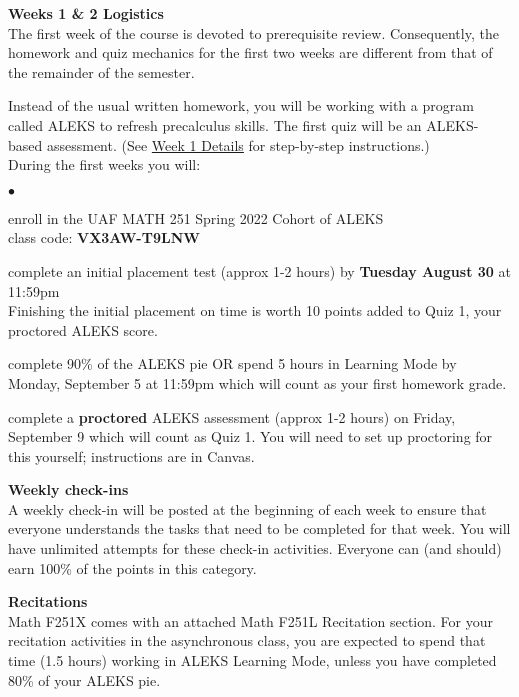 \documentclass[12pt]{article}
\renewcommand{\emph}[1]{\textsf{\textbf{#1}}}
\newcommand{\localhead}[1]{\par\smallskip\textbf{#1}\nobreak\\}%
\def\heading#1{\localhead{\large\emph{#1}}}
\newenvironment{clist}%
{\bgroup\parskip 0pt\begin{list}{$\bullet$}{\partopsep 4pt\topsep 0pt\itemsep -2pt}}%
{\end{list}\egroup}%
\begin{document}
\heading{Weeks 1 \& 2 Logistics}
The first week of the course is devoted to prerequisite review. Consequently, the homework and quiz mechanics for the first two weeks are different from that of the remainder of the semester.

Instead of the usual written homework, you will be
working with a program called ALEKS to refresh precalculus skills. The first
quiz will be an ALEKS-based assessment. (See \href{https://uaf-math251.github.io/week1-ALEKS.html}{Week 1 Details} for step-by-step instructions.)\\ 
During the first weeks you will:
\begin{clist}
\item enroll in the UAF MATH 251 Spring 2022 Cohort of ALEKS\\
class code: \textbf{VX3AW-T9LNW} %
\item complete an initial placement test (approx 1-2 hours) by \textbf{Tuesday August 30} at 11:59pm \\
Finishing the initial placement on time is worth 10 points added to Quiz 1, your proctored ALEKS score.
\item complete 90\% of the ALEKS pie \: OR \: spend 5 hours in Learning Mode by Monday, September 5 at 11:59pm which will count as your first homework grade.
\item complete a \emph{proctored} ALEKS assessment (approx 1-2 hours) on Friday, September 9 which will count as Quiz 1. You will need to set up proctoring for this yourself; instructions are in Canvas.
\end{clist}

\heading{Weekly check-ins}
A weekly check-in will be posted at the beginning of each week to ensure that everyone understands the tasks that need to be completed for that week. You will have unlimited attempts for these check-in activities. Everyone can (and should) earn 100\% of the points in this category.

\heading{Recitations}

Math F251X comes with an attached Math F251L Recitation section. For your recitation activities in the asynchronous class, you are expected to spend that time (1.5 hours) working in ALEKS Learning Mode, unless you have completed 80\% of your ALEKS pie.
\end{document}
